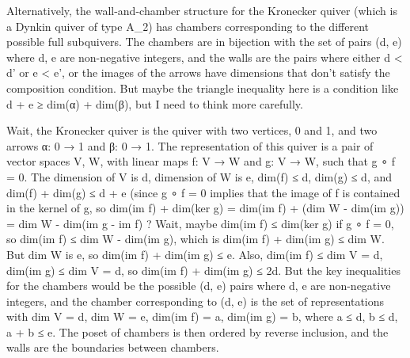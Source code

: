 Alternatively, the wall-and-chamber structure for the Kronecker quiver (which is a Dynkin quiver of type A_2) has chambers corresponding to the different possible full subquivers. The chambers are in bijection with the set of pairs (d, e) where d, e are non-negative integers, and the walls are the pairs where either d < d' or e < e', or the images of the arrows have dimensions that don't satisfy the composition condition. But maybe the triangle inequality here is a condition like d + e ≥ dim(α) + dim(β), but I need to think more carefully.

Wait, the Kronecker quiver is the quiver with two vertices, 0 and 1, and two arrows α: 0 → 1 and β: 0 → 1. The representation of this quiver is a pair of vector spaces V, W, with linear maps f: V → W and g: V → W, such that g ∘ f = 0. The dimension of V is d, dimension of W is e, dim(f) ≤ d, dim(g) ≤ d, and dim(f) + dim(g) ≤ d + e (since g ∘ f = 0 implies that the image of f is contained in the kernel of g, so dim(im f) + dim(ker g) = dim(im f) + (dim W - dim(im g)) = dim W - dim(im g - im f) ? Wait, maybe dim(im f) ≤ dim(ker g) if g ∘ f = 0, so dim(im f) ≤ dim W - dim(im g), which is dim(im f) + dim(im g) ≤ dim W. But dim W is e, so dim(im f) + dim(im g) ≤ e. Also, dim(im f) ≤ dim V = d, dim(im g) ≤ dim V = d, so dim(im f) + dim(im g) ≤ 2d. But the key inequalities for the chambers would be the possible (d, e) pairs where d, e are non-negative integers, and the chamber corresponding to (d, e) is the set of representations with dim V = d, dim W = e, dim(im f) = a, dim(im g) = b, where a ≤ d, b ≤ d, a + b ≤ e. The poset of chambers is then ordered by reverse inclusion, and the walls are the boundaries between chambers.

